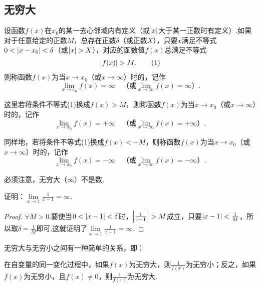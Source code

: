 \subsection{无穷大}
\begin{definition}
设函数\(f(x)\)在\(x_0\)的某一去心邻域内有定义（或\(\abs{x}\)大于某一正数时有定义）.如果对于任意给定的正数\(M\)，总存在正数\(\delta\)（或正数\(X\)），只要\(x\)满足不等式\(0 < \abs{x - x_0} < \delta\)（或\(\abs{x} > X\)），对应的函数值\(f(x)\)总满足不等式\begin{gather}
\abs{f(x)} > M, \tag1
\end{gather}则称函数\(f(x)\)为当\(x \to x_0\)（或\(x \to \infty\)）时的，记作\[
\lim\limits_{x \to x_0}f(x) = \infty
\quad\text{（或} \lim\limits_{x \to \infty}f(x) = \infty \text{）}.
\]

这里若将条件不等式(1)换成\(f(x) > M\)，则称函数\(f(x)\)为当\(x \to x_0\)（或\(x \to \infty\)）时的，记作\[
\lim\limits_{x \to x_0}f(x) = +\infty
\quad\text{（或} \lim\limits_{x \to \infty}f(x) = +\infty \text{）}.
\]

同样地，若将条件不等式(1)换成\(f(x) < -M\)，则称函数\(f(x)\)为当\(x \to x_0\)（或\(x \to \infty\)）时的，记作\[
\lim\limits_{x \to x_0}f(x) = -\infty
\quad\text{（或} \lim\limits_{x \to \infty}f(x) = -\infty \text{）}.
\]
\end{definition}
必须注意，无穷大（\(\infty\)）不是数.

\begin{example}
证明：\(\lim\limits_{x\to1}\frac{1}{x-1}=\infty\).
\begin{proof}
\(\forall M>0\).要使当\(0<\abs{x-1}<\delta\)时，\(\abs{\frac{1}{x-1}}>M\)成立，只要\(\abs{x-1}<\frac{1}{M}\)，所以取\(\delta=\frac{1}{M}\)即可.这就证明了\(\lim\limits_{x\to1}\frac{1}{x-1}=\infty\).
\end{proof}
\end{example}

无穷大与无穷小之间有一种简单的关系，即：
\begin{theorem}\label{theorem:极限.无穷大与无穷小的关系}
在自变量的同一变化过程中，如果\(f(x)\)为无穷大，则\(\frac{1}{f(x)}\)为无穷小；反之，如果\(f(x)\)为无穷小，且\(f(x) \neq 0\)，则\(\frac{1}{f(x)}\)为无穷大.
\end{theorem}

